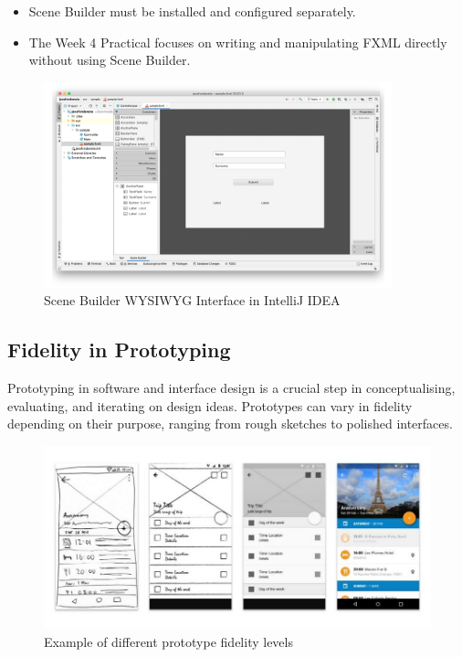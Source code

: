 \documentclass{article}
\begin{document}
\begin{itemize}
    \item Scene Builder must be installed and configured separately.
    \item The Week 4 Practical focuses on writing and manipulating FXML directly without using Scene Builder.
\end{itemize}

\begin{figure}[H]
    \centering
    \includegraphics[width=0.9\textwidth]{scene-builder.png}
    \caption{Scene Builder WYSIWYG Interface in IntelliJ IDEA}
\end{figure}

\subsection{Fidelity in Prototyping}

Prototyping in software and interface design is a crucial step in conceptualising, evaluating, and iterating on design ideas. Prototypes can vary in fidelity depending on their purpose, ranging from rough sketches to polished interfaces.

\begin{figure}[h!]
\centering
\includegraphics[width=0.9\linewidth]{fidelity.jpg}
\caption{Example of different prototype fidelity levels}
\label{fig:prototype-fidelity}
\end{figure}
\end{document}
